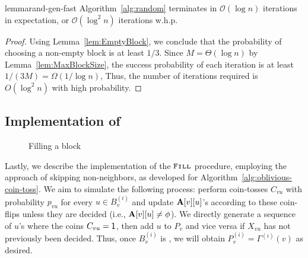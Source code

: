 \begin{restatable}{lemma}{rand-gen-fast}
\label{lem:rand_gen_fast}
Algorithm~\ref{alg:random} terminates in $\mathcal{O}(\log n)$ iterations in expectation, or $\mathcal{O}(\log^2 n)$ iterations w.h.p.
\end{restatable}
\begin{proof}
Using Lemma~\ref{lem:EmptyBlock}, we conclude that
the probability of choosing a non-empty block is at least $1/3$.
Since $M = \Theta(\log n)$ by Lemma~\ref{lem:MaxBlockSize}, the success probability of each iteration is at least $1/(3M)=\Omega(1/\log n)$,
Thus, the number of iterations required is $O(\log^2 n)$ with high probability.
\end{proof}





\subsection{Implementation of }
\label{sec:fill_implement}

\begin{wrapfigure}[13]{R}{0.45\textwidth}
\vspace{-3em}
\begin{framed}
    \renewcommand\figurename{Algorithm}
    \caption{Filling a block}
    \label{alg:fill}
    \begin{algorithmic}
                \EndIf
            \EndWhile
    \EndProcedure
    \end{algorithmic}
\end{framed}
\end{wrapfigure}

Lastly, we describe the implementation of the $\texttt{\textsc{Fill}}$ procedure, employing the approach of skipping non-neighbors, as developed for Algorithm~\ref{alg:oblivious-coin-toss}. We aim to simulate the following process: perform coin-tosses $C_{vu}$ with probability $p_{vu}$ for every $u \in B^{(i)}_v$ and update $\mathbf{A}[v][u]$'s according to these coin-flips unless they are decided (i.e., $\mathbf{A}[v][u] \neq \phi$). We directly generate a sequence of $u$'s where the coins $C_{vu} = \mathsf{1}$, then add $u$ to $P_v$ and vice versa if $X_{vu}$ has not previously been decided. Thus, once $B^{(i)}_v$ is \filled, we will obtain $P_v^{(i)} = \Gamma^{(i)}(v)$ as desired.

